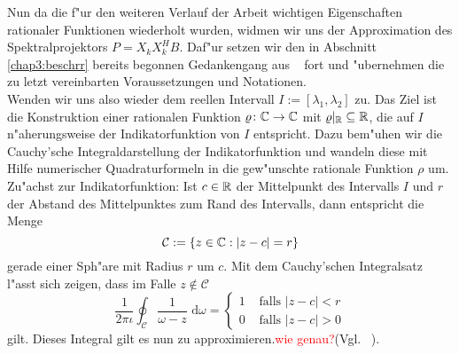 Nun da die f"ur den weiteren Verlauf der Arbeit wichtigen Eigenschaften rationaler
Funktionen wiederholt wurden, widmen wir uns der Approximation des Spektralprojektors
$P = X_k X_k^H B$. Daf"ur setzen wir den in Abschnitt \ref{chap3:beschrr} bereits begonnen Gedankengang aus ~\cite{ptep}
fort und "ubernehmen die zu letzt vereinbarten Voraussetzungen und Notationen.\\

Wenden wir uns also wieder dem reellen Intervall $I := [\lambda_1, \lambda_2]$ zu. Das Ziel ist
die Konstruktion einer rationalen Funktion $\varrho\colon\mathbb{C}\to\mathbb{C}$ mit $\varrho|_{\mathbb{R}} \subseteq \mathbb{R}$,
die auf $I$ n"aherungsweise der Indikatorfunktion von $I$ entspricht. Dazu
bem"uhen wir die Cauchy'sche Integraldarstellung der Indikatorfunktion und
wandeln diese mit Hilfe numerischer Quadraturformeln in die gew"unschte
rationale Funktion $\rho$ um.\\

Zu"achst zur Indikatorfunktion: Ist $c\in\mathbb{R}$ der Mittelpunkt des Intervalls $I$ und
$r$ der Abstand des Mittelpunktes zum Rand des Intervalls, dann entspricht die Menge
\[
\mathcal{C} := \{z\in\mathbb{C} : |z-c| = r\}
\]
gerade einer Sph"are mit Radius $r$ um $c$. Mit dem Cauchy'schen Integralsatz
l"asst sich zeigen, dass im Falle $z\notin \mathcal{C}$
\[
\frac{1}{2\pi\iota}\oint_{ \mathcal{C}}\frac{1}{\omega-z}\text{ d}\omega
= \begin{cases}1 &\text{ falls }|z-c| < r \\ 0 &\text{ falls }|z-c| > 0 \end{cases}
\]
gilt. Dieses Integral gilt es nun zu approximieren.\textcolor{red}{wie genau?}(Vgl. ~\cite[20]{jaenich}).\\


